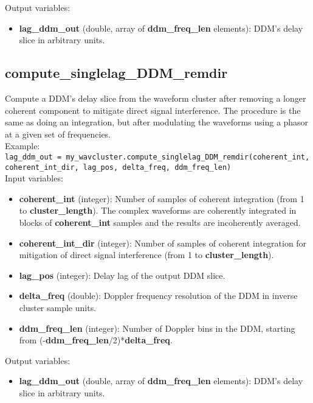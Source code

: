 Output variables:
\begin{itemize}
\item {\bf lag\_ddm\_out} (double, array of {\bf ddm\_freq\_len} elements): DDM's delay slice in arbitrary units.
\end{itemize}


\subsection{compute\_singlelag\_DDM\_remdir}

Compute a DDM's delay slice from the waveform cluster after removing a longer coherent component to mitigate direct signal interference. The procedure is the same as doing an integration, but after modulating the waveforms using a phasor at a given set of frequencies.\\

Example:\\

\texttt{lag\_ddm\_out = my\_wavcluster.compute\_singlelag\_DDM\_remdir(coherent\_int, coherent\_int\_dir, lag\_pos, delta\_freq, ddm\_freq\_len)}\\

Input variables:
\begin{itemize}
\item {\bf coherent\_int} (integer): Number of samples of coherent integration (from 1 to {\bf cluster\_length}). The complex waveforms are coherently integrated in blocks of {\bf coherent\_int} samples and the results are incoherently averaged.
\item {\bf coherent\_int\_dir} (integer): Number of samples of coherent integration for mitigation of direct signal interference (from 1 to {\bf cluster\_length}).
\item {\bf lag\_pos} (integer): Delay lag of the output DDM slice.
\item {\bf delta\_freq} (double): Doppler frequency resolution of the DDM in inverse cluster sample units.
\item {\bf ddm\_freq\_len} (integer): Number of Doppler bins in the DDM, starting from (-{\bf ddm\_freq\_len}/2)*{\bf delta\_freq}.
\end{itemize}

Output variables:
\begin{itemize}
\item {\bf lag\_ddm\_out} (double, array of {\bf ddm\_freq\_len} elements): DDM's delay slice in arbitrary units.
\end{itemize}


